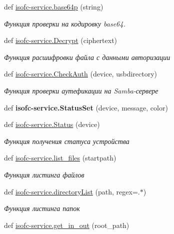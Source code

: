\begin{DoxyCompactItemize}
def \mbox{\hyperlink{isofc-service_8py_a3a76537b729e2a715e4c0c781f59f322}{isofc-\/service.\+base64p}} (string)
\begin{DoxyCompactList}\small\item\em Функция проверки на кодировку base64. \end{DoxyCompactList}\item 
def \mbox{\hyperlink{isofc-service_8py_a0eba86fbc79aa01ca16b5fd058c85638}{isofc-\/service.\+Decrypt}} (ciphertext)
\begin{DoxyCompactList}\small\item\em Функция расшифровки файла с данными авторизации \end{DoxyCompactList}\item 
def \mbox{\hyperlink{isofc-service_8py_ae80f4771b0644a980f33148b21453267}{isofc-\/service.\+Check\+Auth}} (device, usbdirectory)
\begin{DoxyCompactList}\small\item\em Функция проверки аутефикации на Samba-\/сервере \end{DoxyCompactList}\item 
\mbox{\label{isofc-service_8py_a104b32abfb43e0783756cc675951fe97}} 
def {\bfseries isofc-\/service.\+Status\+Set} (device, message, color)
\item 
def \mbox{\hyperlink{isofc-service_8py_ade5fb73a2623e6354a2453b612e1943b}{isofc-\/service.\+Status}} (device)
\begin{DoxyCompactList}\small\item\em Функция получения статуса устройства \end{DoxyCompactList}\item 
def \mbox{\hyperlink{isofc-service_8py_ad73dd86c759cc2bab83e283b1ec6f40e}{isofc-\/service.\+list\+\_\+files}} (startpath)
\begin{DoxyCompactList}\small\item\em Функция листинга файлов \end{DoxyCompactList}\item 
def \mbox{\hyperlink{isofc-service_8py_a316116b0d70bb8af538da4fab408d0cf}{isofc-\/service.\+directory\+List}} (path, regex=\textquotesingle{}.$\ast$\textquotesingle{})
\begin{DoxyCompactList}\small\item\em Функция листинга папок \end{DoxyCompactList}\item 
def \mbox{\hyperlink{isofc-service_8py_a6d7f6ce07faf5f5b2588f8717407ca3b}{isofc-\/service.\+get\+\_\+in\+\_\+out}} (root\+\_\+path)

\end{DoxyCompactItemize}
